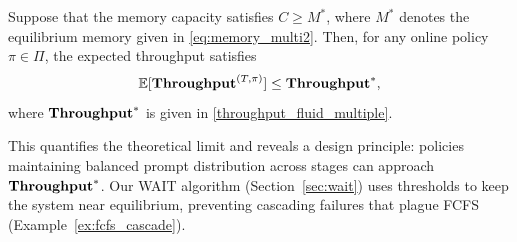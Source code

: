 \begin{proposition}\label{prop::online policy expected throughput upper bound, multiple type}
Suppose that the memory capacity satisfies \(C \geq M^*\), where \(M^*\) denotes the equilibrium memory given in \eqref{eq:memory_multi2}. Then, for any online policy \(\pi \in \Pi\), the expected throughput satisfies
\[
\mathbb{E}[\textbf{Throughput}^{(T,\pi)}] \leq \textbf{Throughput}^*,
\]
where \(\textbf{Throughput}^*\) is given in \eqref{throughput_fluid_multiple}.
\end{proposition}
This quantifies the theoretical limit and reveals a design principle: policies maintaining balanced prompt distribution across stages can approach $\textbf{Throughput}^*$. Our WAIT algorithm (Section~\ref{sec:wait}) uses thresholds to keep the system near equilibrium, preventing cascading failures that plague FCFS (Example~\ref{ex:fcfs_cascade}).




